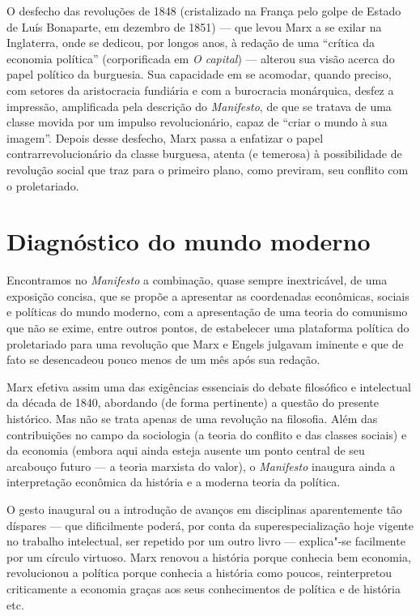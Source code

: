 O desfecho das revoluções de 1848 (cristalizado na França pelo golpe de
Estado de Luís Bonaparte, em dezembro de 1851) --- que levou Marx a se
exilar na Inglaterra, onde se dedicou, por longos anos, à redação de
uma “crítica da economia política” (corporificada em \textit{O
capital}) --- alterou sua visão acerca do papel político da burguesia.
Sua capacidade em se acomodar, quando preciso, com setores da
aristocracia fundiária e com a burocracia monárquica, desfez a
impressão, amplificada pela descrição do \textit{Manifesto}, de que se
tratava de uma classe movida por um impulso revolucionário, capaz de
“criar o mundo à sua imagem”. Depois desse desfecho, Marx passa a
enfatizar o papel contrarrevolucionário da classe burguesa, atenta (e
temerosa) à possibilidade de revolução social que traz para o primeiro
plano, como previram, seu conflito com o proletariado.

\section*{Diagnóstico do mundo moderno}

Encontramos no \textit{Manifesto} a combinação, quase sempre
inextricável, de uma exposição concisa, que se propõe a apresentar as
coordenadas econômicas, sociais e políticas do mundo moderno, com a
apresentação de uma teoria do comunismo que não se exime, entre outros
pontos, de estabelecer uma plataforma política do proletariado para uma
revolução que Marx e Engels julgavam iminente e que de fato se
desencadeou pouco menos de um mês após sua redação.

Marx efetiva assim uma das exigências essenciais do debate filosófico e
intelectual da década de 1840, abordando (de forma pertinente) a
questão do presente histórico. Mas não se trata apenas de uma revolução
na filosofia. Além das contribuições no campo da sociologia (a teoria
do conflito e das classes sociais) e da economia (embora aqui ainda
esteja ausente um ponto central de seu arcabouço futuro --- a teoria
marxista do valor), o \textit{Manifesto} inaugura ainda a
interpretação econômica da história e a moderna teoria da política.

O gesto inaugural ou a introdução de avanços em disciplinas
aparentemente tão díspares --- que dificilmente poderá, por conta da
superespecialização hoje vigente no trabalho intelectual, ser repetido
por um outro livro --- explica"-se facilmente por um círculo virtuoso.
Marx renovou a história porque conhecia bem economia, revolucionou a
política porque conhecia a história como poucos, reinterpretou
criticamente a economia graças aos seus conhecimentos de política e de
história etc.

